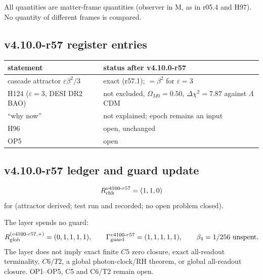 All quantities are matter-frame quantities (observer in M, as in r05.4 and H97).  No quantity of different frames is compared.

\subsection*{v4.10.0-r57 register entries}
\label{subsec:v4100-r57-register}

\begin{center}
\small
\begin{tabular}{@{}>{\raggedright\arraybackslash}p{}>{\raggedright\arraybackslash}p{}@{}}
\toprule
statement & status after v4.10.0-r57\\
\midrule
cascade attractor \(\varepsilon\beta^2/3\) & exact (r57.1); \(=\beta^2\) for \(\varepsilon=3\)\\
H124 (\(\varepsilon=3\), DESI DR2 BAO) & not excluded, \(\Omega_{M0}=0.50\), \(\Delta\chi^2=7.87\) against \(\Lambda\)CDM\\
``why now'' & not explained; epoch remains an input\\
H96 & open, unchanged\\
OP5 & open\\
\bottomrule
\end{tabular}
\end{center}

\subsection*{v4.10.0-r57 ledger and guard update}
\label{subsec:v4100-r57-ledger-guard}

\[
R_{\rm chk}^{v4100\text{-}r57}=(1,1,0)
\]
for (attractor derived; test run and recorded; no open problem closed).

The layer spends no guard:
\[
R_{\rm glob}^{(v4100\text{-}r57,+)}=(0,1,1,1,1),
\qquad
\Gamma_{\rm guard}^{v4100\text{-}r57}=(1,1,1,1,1),
\qquad
\beta_4=1/256\ \text{unspent}.
\]
The layer does not imply exact finite \(C5\) zero closure, exact all-readout terminality, \(C6/T2\), a global photon-clock/RH theorem,
or global all-readout closure.  OP1--OP5, C5 and C6/T2 remain open.
